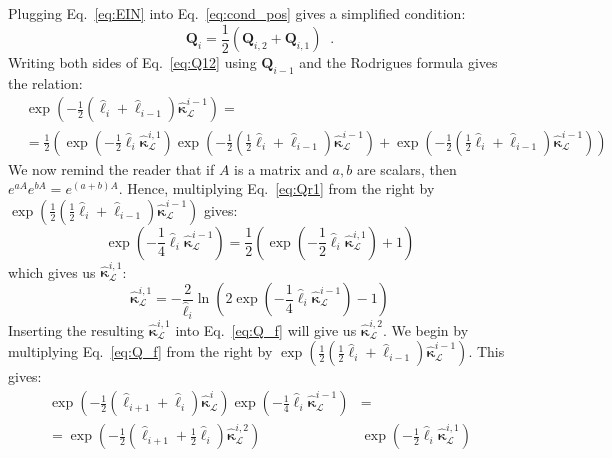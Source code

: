 \documentclass[a4paper, 11pt]{article}
\begin{document}
Plugging Eq.~\ref{eq:EIN} into Eq.~\ref{eq:cond_pos} gives a simplified condition:
\begin{equation}\label{eq:Q12}
    \boldsymbol{Q}_i=\frac{1}{2}\left(\boldsymbol{Q}_{i,2}+\boldsymbol{Q}_{i,1}\right)\;\;.
\end{equation}
Writing both sides of Eq.~\ref{eq:Q12} using $\boldsymbol{Q}_{i-1}$ and the Rodrigues formula gives the relation:
\begin{align}\label{eq:Qr1}
    &\exp\left(-\frac{1}{2}(\hat{\ell}_{i}+\hat{\ell}_{i-1})\hat{\boldsymbol{\kappa}}^{i-1}_\mathcal{L}\right)=\nonumber\\
    &=\frac{1}{2}\left(\exp\left(-\frac{1}{2}\hat{\ell}_i\hat{\boldsymbol{\kappa}}^{i,1}_\mathcal{L}\right)\exp\left(-\frac{1}{2}(\frac{1}{2}\hat{\ell}_{i}+\hat{\ell}_{i-1})\hat{\boldsymbol{\kappa}}^{i-1}_\mathcal{L}\right)+
    \exp\left(-\frac{1}{2}(\frac{1}{2}\hat{\ell}_{i}+\hat{\ell}_{i-1})\hat{\boldsymbol{\kappa}}^{i-1}_\mathcal{L}\right)\right)
\end{align}
We now remind the reader that if $A$ is a matrix and $a,b$ are scalars, then $e^{aA}e^{bA}=e^{(a+b)A}$. Hence, multiplying Eq.~\ref{eq:Qr1} from the right by $\exp\left(\frac{1}{2}(\frac{1}{2}\hat{\ell}_{i}+\hat{\ell}_{i-1})\hat{\boldsymbol{\kappa}}^{i-1}_\mathcal{L}\right)$ gives: 
\begin{equation}\label{eq:k1_1}
    \exp\left(-\frac{1}{4}\hat{\ell}_{i}\hat{\boldsymbol{\kappa}}^{i-1}_\mathcal{L}\right)=\frac{1}{2}\left(\exp\left(-\frac{1}{2}\hat{\ell}_i\hat{\boldsymbol{\kappa}}^{i,1}_\mathcal{L}\right)+1\right)
\end{equation}
which gives us $\hat{\boldsymbol{\kappa}}^{i,1}_\mathcal{L}$:
\begin{equation}\label{eq:kappa1}
    \hat{\boldsymbol{\kappa}}^{i,1}_\mathcal{L}=-\frac{2}{\hat{\ell}_{i}}\ln{\left(2\exp\left(-\frac{1}{4}\hat{\ell}_{i}\hat{\boldsymbol{\kappa}}^{i-1}_\mathcal{L}\right)-1\right)}
\end{equation}
Inserting the resulting $\hat{\boldsymbol{\kappa}}^{i,1}_\mathcal{L}$ into Eq.~\ref{eq:Q_f} will give us $\hat{\boldsymbol{\kappa}}^{i,2}_\mathcal{L}$. We begin by multiplying Eq.~\ref{eq:Q_f} from the right by $\exp\left(\frac{1}{2}(\frac{1}{2}\hat{\ell}_{i}+\hat{\ell}_{i-1})\hat{\boldsymbol{\kappa}}^{i-1}_\mathcal{L}\right)$. This gives:
\begin{align}\label{eq:Q_fd}
    \exp\left(-{\frac{1}{2}(\hat{\ell}_{i+1}+\hat{\ell}_{i})\hat{\boldsymbol{\kappa}}^i_\mathcal{L}}\right)\exp\left(-\frac{1}{4}\hat{\ell}_{i}\hat{\boldsymbol{\kappa}}^{i-1}_\mathcal{L}\right)&=\nonumber\\
    =\exp\left(-\frac{1}{2}(\hat{\ell}_{i+1}+\frac{1}{2}\hat{\ell}_{i})\hat{\boldsymbol{\kappa}}^{i,2}_\mathcal{L}\right)&\exp\left(-\frac{1}{2}\hat{\ell}_i\hat{\boldsymbol{\kappa}}^{i,1}_\mathcal{L}\right)
\end{align}
\end{document}
